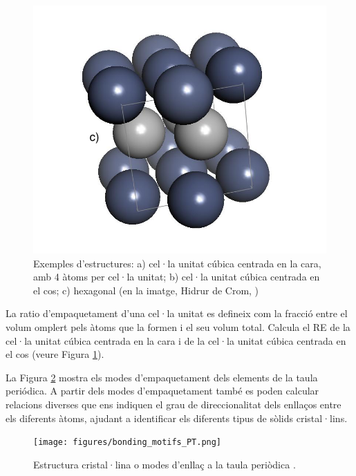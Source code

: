 \begin{figure}[h]
\includegraphics[scale=0.32]{figures/HCP_crystal_structure.png}
\caption[Exemples d'estructures cristal·lines]{Exemples d'estructures: a) cel·la unitat cúbica centrada en la cara, amb 4 àtoms per cel·la unitat; b) cel·la unitat cúbica centrada en el cos; c) hexagonal (en la imatge, Hidrur de Crom, )}
\label{fig:crystal_structure}
\end{figure}

\begin{exr}
La ratio d'empaquetament d'una cel·la unitat es defineix com la fracció entre el volum omplert pels àtoms que la formen i el seu volum total. Calcula el RE de la cel·la unitat cúbica centrada en la cara i de la cel·la unitat cúbica centrada en el cos (veure Figura \ref{fig:crystal_structure}).
\end{exr}

La Figura \ref{fig:bonding_motifs_PT} mostra els modes d'empaquetament dels elements de la taula periódica. A partir dels modes d'empaquetament també es poden calcular relacions diverses que ens indiquen el grau de direccionalitat dels enllaços entre els diferents àtoms, ajudant a identificar els diferents tipus de sòlids cristal·lins.
\begin{figure}[h]
\centering
\texttt{[image: figures/bonding\_motifs\_PT.png]}
\caption{Estructura cristal·lina o modes d'enllaç a la taula periòdica \cite{yen_chemistry_2008}.}
\label{fig:bonding_motifs_PT}
\end{figure}

